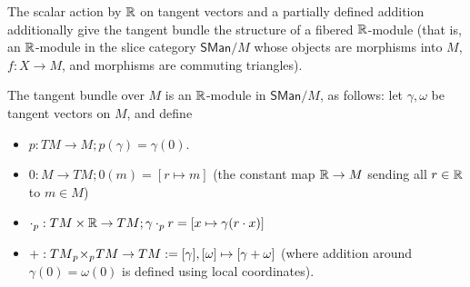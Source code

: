 The scalar action by $\mathbb{R}$ on tangent vectors and a partially defined addition additionally give the tangent bundle the structure of a fibered $\mathbb{R}$-module (that is, an $\mathbb{R}$-module in the slice category $\mathsf{SMan}/M$ whose objects are morphisms into $M$, $f:X \to M$, and morphisms are commuting triangles).
\begin{proposition}
    The tangent bundle over $M$ is an $\mathbb{R}$-module in $\mathsf{SMan}/M$, as follows:
    let $\gamma, \omega$ be tangent vectors on $M$, and define
    \begin{itemize}
        \item $p: TM \to M; p(\gamma) = \gamma(0)$.
        \item $0: M \to TM; 0(m) =  [r \mapsto m]$ (the constant map $\mathbb{R} \to M$ sending all $r\in \mathbb{R}$ to $m\in M$)
        \item $\cdot_p: TM \times \mathbb{R} \to TM; \gamma \cdot_p r = [x \mapsto \gamma(r \cdot x)]$
        \item $+: TM {_{p}}\!\times_{p}\! TM \to TM := [\gamma],[\omega] \mapsto [\gamma + \omega]$ (where addition around $\gamma(0)=\omega(0)$ is defined using local coordinates). 
    \end{itemize}
\end{proposition}

